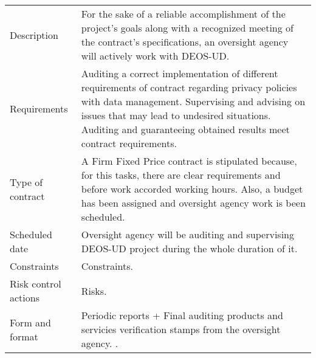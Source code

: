 \begin{table}[H]
	\centering
	\begin{tabular}{>{\raggedright\arraybackslash}p{3cm} >{\arraybackslash}p{11cm}}
		
		\toprule[2pt]
		
		\multicolumn{2}{c}{\textbf{SOW - Auditing}}\\
		
		\midrule[1.5pt]
		
		Description & For the sake of a reliable accomplishment of the project's goals along with a recognized meeting of the contract's specifications, an oversight agency will actively work with DEOS-UD.\vspace{0.2cm} \\
		
		\midrule
		
		Requirements &Auditing a correct implementation of different requirements of contract regarding privacy policies with data management. Supervising and advising on issues that may lead to undesired situations. Auditing and guaranteeing obtained results meet contract requirements.\vspace{0.2cm} \\
		
		\midrule
		
		Type of contract & A Firm Fixed Price contract is stipulated because, for this tasks, there are clear requirements and before work accorded working hours. Also, a budget has been assigned and oversight agency work is been scheduled.\vspace{0.2cm} \\
		
		\midrule
		
		Scheduled date & Oversight agency will be auditing and supervising DEOS-UD project during the whole duration of it.\vspace{0.2cm} \\
		
		\midrule
		
		Constraints & Constraints.\vspace{0.2cm} \\
		
		\midrule
		
		Risk control actions & Risks.\vspace{0.2cm} \\
		
		\midrule
		
		Form and format & Periodic reports + Final auditing products and servicies verification stamps from the oversight agency. .\vspace{0.2cm} \\
		

\end{tabular}
\end{table}
